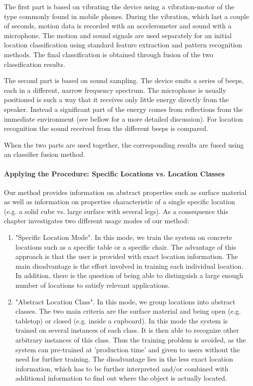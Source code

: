 The first part is based on vibrating the device using a 
vibration-motor of the type commonly found in mobile phones. During
the vibration, which last a couple of seconds, motion data is recorded with
an accelerometer and sound with a microphone. The motion and sound
signals are used separately for an initial location
classification using standard feature extraction and pattern 
recognition methods. The final classification is obtained
through fusion of the two classification results. 

The second part is based on sound sampling. The device emits a series
of beeps, each in a different, narrow frequency spectrum. The
microphone is usually positioned is such a way that it receives only little energy
directly from the speaker. Instead a significant part of the energy
comes from reflections from the immediate environment (see bellow 
for a more detailed discussion). For location
recognition the sound received from the different beeps is compared. 

When the two parts are used together, the corresponding results are
fused using an classifier fusion method. 

\paragraph{Applying the Procedure: Specific Locations vs. Location Classes}
 Our method provides information on
abstract properties such as surface material as well as information
on properties characteristic of a single specific location (e.g. a
solid cube vs. large surface with several legs). As a consequence this
chapter investigates two different usage modes of our method:
\begin{enumerate}
\item "Specific Location Mode". In this mode, we train the system on
 concrete locations such as a specific table or a specific chair. The advantage of this approach is that the user
 is provided with exact location information. The main disadvantage is the
 effort involved in training each individual location. In addition,
 there is the question of being able to distinguish a large enough number of
 locations to satisfy relevant applications. 
\item "Abstract Location Class". In this mode, we group locations into
 abstract classes. The two main criteria are the surface material and
 being open (e.g. tabletop) or closed (e.g. inside a cupboard). In
 this mode the system is trained on several instances of each
 class. It is then able to recognize other arbitrary instances of
 this class. Thus the training problem is avoided, as the system can
 pre-trained at 'production time' and given to users without the need
 for further training. The disadvantage lies in the less exact
 location information, which has to be further interpreted and/or
 combined with additional information to find out where the object is
 actually located.
\end{enumerate} 


